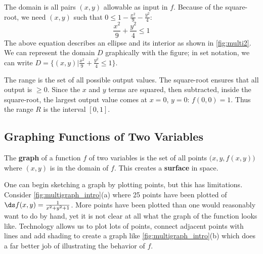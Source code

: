 {The domain is all pairs $(x,y)$ allowable as input in $f$. Because of the square-root, we need $(x,y)$ such that $0\leq1-\frac{x^2}9-\frac{y^2}4$:
\[\frac{x^2}9+\frac{y^2}4 \leq 1\]
The above equation describes an ellipse and its interior as shown in \autoref{fig:multi2}. We can represent the domain $D$ graphically with the figure; in set notation, we can write $D = \{(x,y)\vert\frac{x^2}9+\frac{y^2}4 \leq 1\}$.

The range is the set of all possible output values. The square-root ensures that all output is $\geq 0$. Since the $x$ and $y$ terms are squared, then subtracted, inside the square-root, the largest output value comes at $x=0$, $y=0$: $f(0,0) = 1$. Thus the range $R$ is the interval $[0,1]$.}

\subsection{Graphing Functions of Two Variables}


The \textbf{graph} of a function $f$ of two variables is the set of all points $\big(x,y,f(x,y)\big)$ where $(x,y)$ is in the domain of $f$. This creates a \textbf{surface} in space.

One can begin sketching a graph by plotting points, but this has limitations. Consider \autoref{fig:multigraph_intro}(a) where 25 points have been plotted of $\ds f(x,y) = \frac1{x^2+y^2+1}$. More points have been plotted than one would reasonably want to do by hand, yet it is not clear at all what the graph of the function looks like. Technology allows us to plot lots of points, connect adjacent points with lines and add shading to create a graph like \autoref{fig:multigraph_intro}(b) which does a far better job of illustrating the behavior of $f$.

